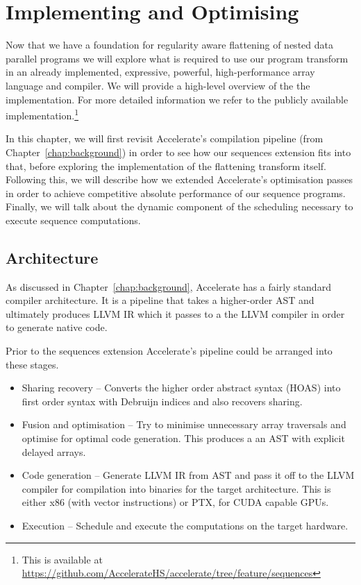 \chapter{Implementing and Optimising}
\label{chap:implementation}

Now that we have a foundation for regularity aware flattening of nested data parallel programs we will explore what is required to use our program transform in an already implemented, expressive, powerful, high-performance array language and compiler. We will provide a high-level overview of the the implementation. For more detailed information we refer to the publicly available implementation.\footnote{This is available at \url{https://github.com/AccelerateHS/accelerate/tree/feature/sequences}}

In this chapter, we will first revisit Accelerate's compilation pipeline (from Chapter~\ref{chap:background}) in order to see how our sequences extension fits into that, before exploring the implementation of the flattening transform itself. Following this, we will describe how we extended Accelerate's optimisation passes in order to achieve competitive absolute performance of our sequence programs. Finally, we will talk about the dynamic component of the scheduling necessary to execute sequence computations.

\section{Architecture}
As discussed in Chapter~\ref{chap:background}, Accelerate has a fairly standard compiler architecture. It is a pipeline that takes a higher-order AST and ultimately produces LLVM IR which it passes to a the LLVM compiler in order to generate native code.

Prior to the sequences extension Accelerate's pipeline could be arranged into these stages.

\begin{itemize}
%
\item Sharing recovery -- Converts the higher order abstract syntax (HOAS) into first order syntax with Debruijn indices and also recovers sharing.
%
%
\item Fusion and optimisation -- Try to minimise unnecessary array traversals and optimise for optimal code generation. This produces a an AST with explicit delayed arrays.
%
\item Code generation -- Generate LLVM IR from AST and pass it off to the LLVM compiler for compilation into binaries for the target architecture. This is either x86 (with vector instructions) or PTX, for CUDA capable GPUs.
%
\item Execution -- Schedule and execute the computations on the target hardware.
\end{itemize}

